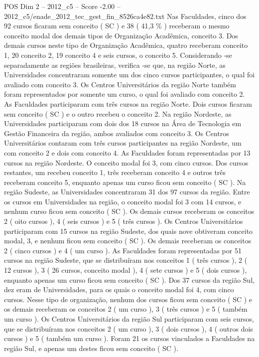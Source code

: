 \begin{textsample}{POS Dim 2 – 2012\_c5 – Score -2.00 – 2012\_c5/enade\_2012\_tec\_gest\_fin\_8526ca4e82.txt}
Nas Faculdades, cinco dos 92 cursos ficaram sem conceito ( SC ) e 38 ( 41,3 \% ) receberam o mesmo conceito modal dos demais tipos de Organização Acadêmica, conceito 3.
Dos demais cursos neste tipo de Organização Acadêmica, quatro receberam conceito 1, 20 conceito 2, 19 conceito 4 e seis cursos, o conceito 5.
Considerando -se separadamente as regiões brasileiras, verifica -se que, na região Norte, as Universidades concentraram somente um dos cinco cursos participantes, o qual foi avaliado com conceito 3.
Os Centros Universitários da região Norte também foram representados por somente um curso, o qual foi avaliado com conceito 2.
As Faculdades participaram com três cursos na região Norte.
Dois cursos ficaram sem conceito ( SC ) e o outro recebeu o conceito 2.
Na região Nordeste, as Universidades participaram com dois dos 18 cursos na Área de Tecnologia em Gestão Financeira da região, ambos avaliados com conceito 3.
Os Centros Universitários contaram com três cursos participantes na região Nordeste, um com conceito 2 e dois com conceito 4.
As Faculdades foram representadas por 13 cursos na região Nordeste.
O conceito modal foi 3, com cinco cursos.
Dos cursos restantes, um recebeu conceito 1, três receberam conceito 4 e outros três receberam conceito 5, enquanto apenas um curso ficou sem conceito ( SC ).
Na região Sudeste, as Universidades concentraram 31 dos 97 cursos da região.
Entre os cursos em Universidades na região, o conceito modal foi 3 com 14 cursos, e nenhum curso ficou sem conceito ( SC ).
Os demais cursos receberam os conceitos 2 ( oito cursos ), 4 ( seis cursos ) e 5 ( três cursos ).
Os Centros Universitários participaram com 15 cursos na região Sudeste, dos quais nove obtiveram conceito modal, 3, e nenhum ficou sem conceito ( SC ).
Os demais receberam os conceitos 2 ( cinco cursos ) e 4 ( um curso ).
As Faculdades foram representadas por 51 cursos na região Sudeste, que se distribuíram nos conceitos 1 ( três cursos ), 2 ( 12 cursos ), 3 ( 26 cursos, conceito modal ), 4 ( sete cursos ) e 5 ( dois cursos ), enquanto apenas um curso ficou sem conceito ( SC ).
Dos 37 cursos da região Sul, dez eram de Universidades, para os quais o conceito modal foi 4, com cinco cursos.
Nesse tipo de organização, nenhum dos cursos ficou sem conceito ( SC ) e os demais receberam os conceitos 2 ( um curso ), 3 ( três cursos ) e 5 ( também um curso ).
Os Centros Universitários da região Sul participaram com seis cursos, que se distribuíram nos conceitos 2 ( um curso ), 3 ( dois cursos ), 4 ( outros dois cursos ) e 5 ( também um curso ).
Foram 21 os cursos vinculados a Faculdades na região Sul, e apenas um destes ficou sem conceito ( SC ).

\end{textsample}
